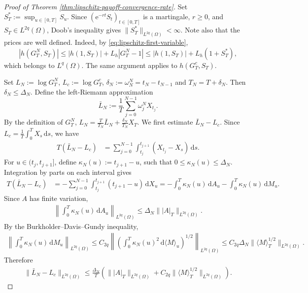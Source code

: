 \documentclass[10pt,a4paper,reqno]{amsart}
\theoremstyle{plain}
\theoremstyle{definition}
\theoremstyle{remark}
\theoremstyle{example}
\begin{document}
\begin{proof}[Proof of Theorem \ref{thm:lipschitz-payoff-convergence-rate}]
    Set $S_T^* := \sup_{u\in[0,T]}S_u$. Since $(\mathrm e^{-rt}S_t)_{t\in[0,T]}$ is a martingale, $r\geq0$, and $S_T\in L^{2q}(\Omega)$, Doob's inequality gives $\|S_T^*\|_{L^{2q}(\Omega)}<\infty$. Note also that the prices are well defined. Indeed, by
    \eqref{eq:lipschitz-first-variable},
    \[
        |h(G_T^N,S_T)| \leq |h(1,S_T)| + L_h|G_T^N-1| \leq |h(1,S_T)| + L_h(1+S_T^*),
    \]
    which belongs to $L^q(\Omega)$. The same argument applies to $h(G_T^c,S_T)$.
    
    Set $L_N:=\log G_T^N$, $L_c:=\log G_T^c$, $\delta_N:=\omega_N^N=t_N-t_{N-1}$ and $T_N=T+\delta_N$. Then $\delta_N\leq\Delta_N$. Define the left-Riemann approximation
    \[
        \bar L_N := \frac1T \sum_{j=0}^{N-1} \omega_j^N X_{t_j}.
    \]
    By the definition of $G_T^N$, $L_N = \frac{T}{T_N}\bar L_N + \frac{\delta_N}{T_N}X_T$. We first estimate $\bar L_N-L_c$. Since $L_c = \frac1T\int_0^T X_s\,\mathrm ds$, we have 
    \begin{align*}
        T(\bar L_N-L_c) &= \sum_{j=0}^{N-1} \int_{t_j}^{t_{j+1}} (X_{t_j}-X_s)\,\mathrm ds.
    \end{align*}
    For $u\in(t_j,t_{j+1}]$, define $\kappa_N(u):=t_{j+1}-u$, such that $0\leq\kappa_N(u)\leq\Delta_N$. Integration by parts on each interval gives
    \begin{align}\label{eq:log-riemann-error}
        T(\bar L_N-L_c) &= -\sum_{j=0}^{N-1} \int_{t_j}^{t_{j+1}} (t_{j+1}-u)\,\mathrm dX_u
        = -\int_0^T\kappa_N(u)\,\mathrm dA_u - \int_0^T\kappa_N(u)\,\mathrm dM_u.
    \end{align}
    Since $A$ has finite variation, 
    \begin{align}\label{eq:A-riemann-bound}
        \left\| \int_0^T\kappa_N(u)\,\mathrm dA_u \right\|_{L^{2q}(\Omega)} \leq \Delta_N \big\||A|_T\big\|_{L^{2q}(\Omega)}.
    \end{align}
    By the Burkholder--Davis--Gundy inequality,
    \begin{align*}
        \left\| \int_0^T\kappa_N(u)\,\mathrm dM_u \right\|_{L^{2q}(\Omega)} \leq C_{2q} \left\| \left( \int_0^T \kappa_N(u)^2\, \mathrm d\langle M\rangle_u \right)^{1/2} \right\|_{L^{2q}(\Omega)} \leq C_{2q}\Delta_N \big\| \langle M\rangle_T^{1/2} \big\|_{L^{2q}(\Omega)}.
    \end{align*}
    Therefore
    \begin{align}\label{eq:left-riemann-log-rate}
        \|\bar L_N-L_c\|_{L^{2q}(\Omega)} \leq \frac{\Delta_N}{T} \left( \big\||A|_T\big\|_{L^{2q}(\Omega)} + C_{2q} \big\|\langle M\rangle_T^{1/2}\big\|_{L^{2q}(\Omega)} \right).
    \end{align}


\end{proof}
\end{document}
